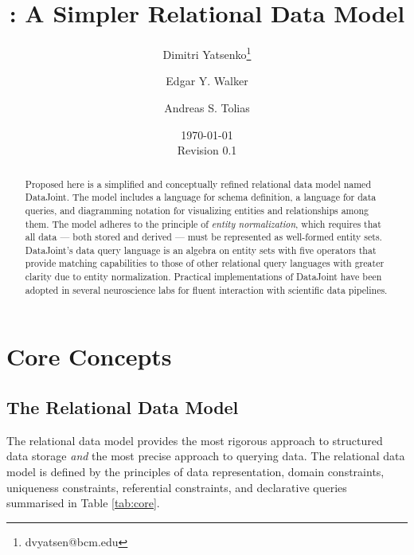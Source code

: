 \documentclass[letter,10pt]{article}
\author[1,2]{Dimitri Yatsenko\thanks{dvyatsen@bcm.edu}}
\author[1,2]{Edgar Y. Walker}
\author[1,2]{Andreas S. Tolias}
\affil[1]{Department of Neuroscience, Baylor College of Medicine, Houston, Texas, USA}
\affil[2]{Vathes LLC, Houston, Texas, USA}
\date{\today\\Revision 0.1}
\title{\datajoint: A Simpler Relational Data Model}
\newcommand{\datajoint}{DataJoint\xspace}
\begin{document}
\maketitle
\begin{abstract}
Proposed here is a simplified and conceptually refined relational data model named \datajoint. 
The model includes a language for schema definition, a language for data queries, and diagramming notation for visualizing entities and relationships among them.  
The model adheres to the principle of \emph{entity normalization}, which requires that all data --- both stored and derived --- must be represented as well-formed entity sets.
\datajoint's data query language is an algebra on entity sets with five operators that provide matching capabilities to those of other relational query languages with greater clarity due to entity normalization. 
Practical implementations of \datajoint have been adopted in several neuroscience labs for fluent interaction with scientific data pipelines.
\end{abstract}
\tableofcontents 

\twocolumn

\section{Core Concepts}
\subsection{The Relational Data Model}
The relational data model \citep{codd_relational_1970} provides the most rigorous approach to structured data storage \emph{and} the most precise approach to querying data.  
The relational data model is defined by the principles of data representation, domain constraints, uniqueness constraints, referential constraints, and declarative queries summarised in Table \ref{tab:core}.
\end{document}
